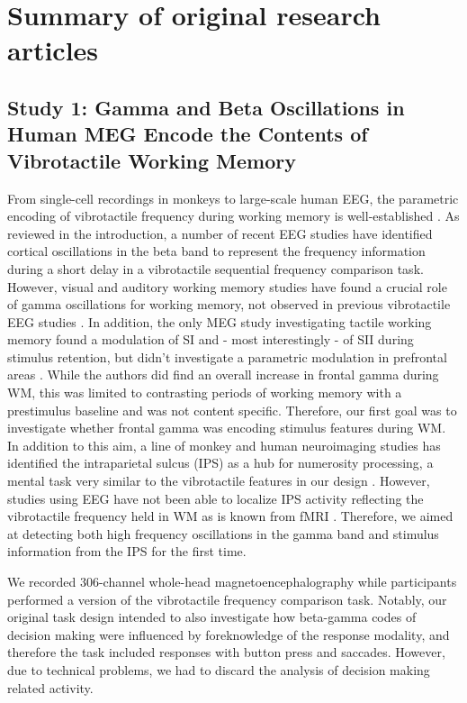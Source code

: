 
\chapter{Summary of original research articles}


\section{Study 1: Gamma and Beta Oscillations in Human MEG Encode the Contents of Vibrotactile Working Memory}
From single-cell recordings in monkeys to large-scale human EEG, the parametric encoding of vibrotactile frequency during working memory is well-established \parencite{Romo1999,Spitzer2010}. As reviewed in the introduction, a number of recent EEG studies have identified cortical oscillations in the beta band to represent the frequency information during a short delay in a vibrotactile sequential frequency comparison task. However, visual and auditory working memory studies have found a crucial role of gamma oscillations for working memory, not observed in previous vibrotactile EEG studies \parencite{Roux2014}. In addition, the only MEG study investigating tactile working memory found a modulation of SI and - most interestingly - of SII during stimulus retention, but didn’t investigate a parametric modulation in prefrontal areas \parencite{Haegens2010}. While the authors did find an overall increase in frontal gamma during WM, this was limited to contrasting periods of working memory with a prestimulus baseline and was not content specific. Therefore, our first goal was to investigate whether frontal gamma was encoding stimulus features during WM. In addition to this aim, a line of monkey and human neuroimaging studies has identified the intraparietal sulcus (IPS) as a hub for numerosity processing, a mental task very similar to the vibrotactile features in our design \parencite{Nieder2016}. However, studies using EEG have not been able to localize IPS activity reflecting the vibrotactile frequency held in WM as is known from fMRI \parencite{Wu2018}. Therefore, we aimed at detecting both high frequency oscillations in the gamma band and stimulus information from the IPS for the first time.

We recorded 306-channel whole-head magnetoencephalography while participants performed a version of the vibrotactile frequency comparison task. Notably, our original task design intended to also investigate how beta-gamma codes of decision making were influenced by foreknowledge of the response modality, and therefore the task included responses with button press and saccades. However, due to technical problems, we had to discard the analysis of decision making related activity. 

